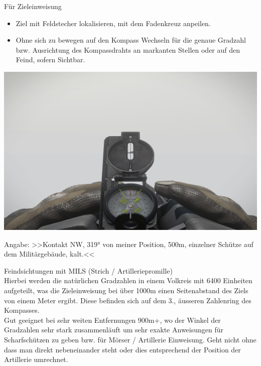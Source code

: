 	Für Zieleinweisung
		\begin{itemize}
 			\item Ziel mit Feldstecher lokalisieren, mit dem Fadenkreuz anpeilen.
			\item Ohne sich zu bewegen auf den Kompass Wechseln für die genaue Gradzahl bzw. Ausrichtung des Kompassdrahts an markanten Stellen oder auf den Feind, sofern Sichtbar.
		\end{itemize}

\begin{minipage}[t]{1\textwidth}
	\includegraphics[width=\textwidth]{./Grafiken/KarteUndMarkierungen/Kompass4.jpg}
\end{minipage}
	Angabe: >>Kontakt NW, 319° von meiner Position, 500m, einzelner Schütze auf dem Militärgebäude, kalt.<<

	Feindsichtungen mit MILS (Strich / Artilleriepromille) \\

	Hierbei werden die natürlichen Gradzahlen in einem Volkreis mit 6400 Einheiten aufgeteilt, was die Zieleinweisung bei über 1000m einen Seitenabstand des Ziels von einem Meter ergibt. Diese befinden sich auf dem 3., äusseren Zahlenring des Kompasses.  \\

	Gut geeignet bei sehr weiten Entfernungen 900m+, wo der Winkel der Gradzahlen sehr stark zusammenläuft um sehr exakte Anweisungen für Scharfschützen zu geben bzw. für Mörser / Artillerie Einweisung. Geht nicht ohne dass man direkt nebeneinander steht oder dies entsprechend der Position der Artillerie umrechnet.  \\

 

